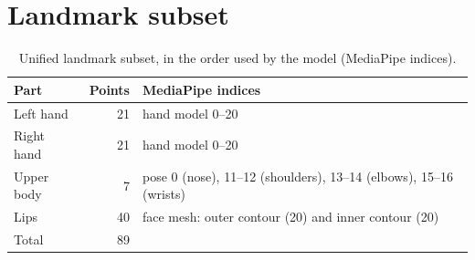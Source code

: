 \section{Landmark subset}
\label{app:landmarks}

\begin{table}[!ht]
  \centering
  \caption{Unified landmark subset, in the order used by the model (MediaPipe indices).}
  \small
  \begin{tabular}{lrl}
    \toprule
    Part & Points & MediaPipe indices \\
    \midrule
    Left hand & 21 & hand model 0--20 \\
    Right hand & 21 & hand model 0--20 \\
    Upper body & 7 & pose 0 (nose), 11--12 (shoulders), 13--14 (elbows), 15--16 (wrists) \\
    Lips & 40 & face mesh: outer contour (20) and inner contour (20) \\
    \midrule
    Total & 89 & \\
    \bottomrule
  \end{tabular}
\end{table}
